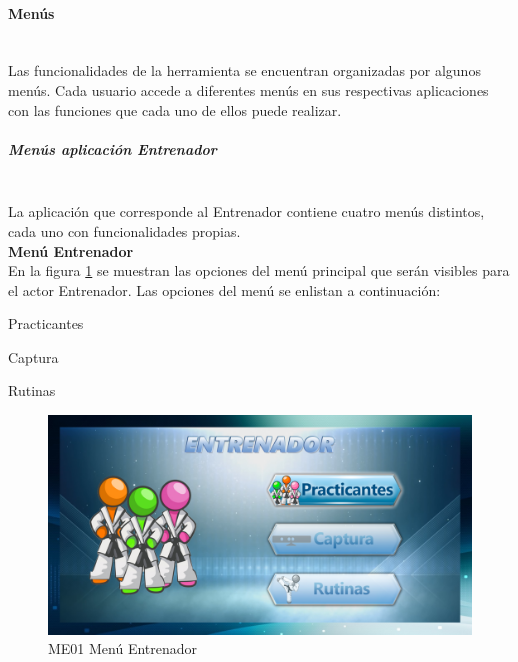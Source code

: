 \paragraph{Menús} \hspace{1cm}\\ 
Las funcionalidades de la herramienta se encuentran organizadas por algunos menús. Cada usuario accede a diferentes menús en sus respectivas aplicaciones con las funciones que cada uno de ellos puede realizar.\\

\subparagraph{Menús aplicación Entrenador} \hspace{1cm}\\ 
La aplicación que corresponde al Entrenador contiene cuatro menús distintos, cada uno con funcionalidades propias. \\

\textbf{\textcolor[rgb]{0, 0, 0.545098}{Menú Entrenador}}\\

En la figura \ref{menu:ME01} se muestran las opciones del menú principal que serán visibles para el actor Entrenador. Las opciones del menú se enlistan a continuación:\\

\begin{compactitem} 
	\setlength\itemsep{-0.25em}
	\item Practicantes
	\item Captura
	\item Rutinas
\end{compactitem} 

\begin{figure}[H]
	\centering
		\includegraphics[scale=0.5]{./Figuras/Menus/ME01Menu_Entrenador}
	\caption{ME01 Menú Entrenador}
	\label{menu:ME01}
\end{figure}

